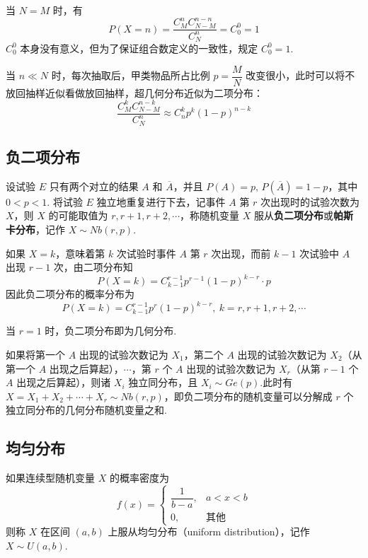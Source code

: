 \begin{note}
    \indent 当 $N=M$ 时，有
    $$
    P(X=n) = \dfrac{C_M^n C_{N-M}^{n-n}}{C_N^n} = C_0^0 = 1
    $$
    $C_0^0$ 本身没有意义，但为了保证组合数定义的一致性，规定 $C_0^0 = 1$.
\end{note}

当 $n \ll N$ 时，每次抽取后，甲类物品所占比例 $p = \dfrac{M}{N}$ 改变很小，此时可以将不放回抽样近似看做放回抽样，超几何分布近似为二项分布：
$$
\dfrac{C_M^k C_{N-M}^{n-k}}{C_N^n} \approx C_n^k p^k (1-p)^{n-k}
$$

\subsection{负二项分布}

设试验 $E$ 只有两个对立的结果 $A$ 和 $\overline{A}$，并且 $P(A)=p, \, P(\overline{A})=1-p$，其中 $0<p<1$. 将试验 $E$ 独立地重复进行下去，记事件 $A$ 第 $r$ 次出现时的试验次数为 $X$，则 $X$ 的可能取值为 $r, r+1, r+2, \cdots$，称随机变量 $X$ 服从\textbf{负二项分布}或\textbf{帕斯卡分布}，记作 $X \sim Nb(r,p)$.

如果 $X=k$，意味着第 $k$ 次试验时事件 $A$ 第 $r$ 次出现，而前 $k-1$ 次试验中 $A$ 出现 $r-1$ 次，由二项分布知
$$
P(X=k) = C_{k-1}^{r-1} p^{r-1} (1-p)^{k-r} \cdot p
$$
因此负二项分布的概率分布为
$$
P(X=k) = C_{k-1}^{r-1} p^r (1-p)^{k-r},\ k = r, r+1, r+2, \cdots
$$

当 $r=1$ 时，负二项分布即为几何分布.

如果将第一个 $A$ 出现的试验次数记为 $X_1$，第二个 $A$ 出现的试验次数记为 $X_2$（从第一个 $A$ 出现之后算起），$\cdots$，第 $r$ 个 $A$ 出现的试验次数记为 $X_r$（从第 $r-1$ 个 $A$ 出现之后算起），则诸 $X_i$ 独立同分布，且 $X_i \sim Ge(p)$.此时有 $X = X_1 + X_2 + \cdots + X_r \sim Nb(r,p)$，即负二项分布的随机变量可以分解成 $r$ 个独立同分布的几何分布随机变量之和.

\subsection{均匀分布}

\begin{definition}
    \indent 如果连续型随机变量 $X$ 的概率密度为
    $$
    f(x)=\begin{cases}
        \dfrac{1}{b-a}, & a<x<b \\[0.5em]
        0, & \text{其他}
    \end{cases}
    $$
    则称 $X$ 在区间 $(a,b)$ 上服从{\heiti 均匀分布}（uniform distribution），记作 $X \sim U(a,b)$.
\end{definition}

